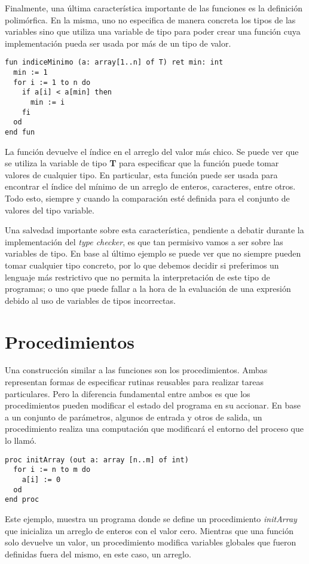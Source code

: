 \documentclass{article}
\begin{document}
Finalmente, una última característica importante de las funciones es la definición polimórfica.
En la misma, uno no especifica de manera concreta los tipos de las variables sino que utiliza una variable de tipo para poder crear una función cuya implementación pueda ser usada por más de un tipo de valor.
\begin{lstlisting}
fun indiceMinimo (a: array[1..n] of T) ret min: int
  min := 1
  for i := 1 to n do
    if a[i] < a[min] then
      min := i
    fi
  od
end fun
\end{lstlisting}

La función devuelve el índice en el arreglo del valor más chico.
Se puede ver que se utiliza la variable de tipo \textbf{T} para especificar que la función puede tomar valores de cualquier tipo.
En particular, esta función puede ser usada para encontrar el índice del mínimo de un arreglo de enteros, caracteres, entre otros.
Todo esto, siempre y cuando la comparación esté definida para el conjunto de valores del tipo variable.

Una salvedad importante sobre esta característica, pendiente a debatir durante la implementación del \textit{type checker}, es que tan permisivo vamos a ser sobre las variables de tipo.
En base al último ejemplo se puede ver que no siempre pueden tomar cualquier tipo concreto, por lo que debemos decidir si preferimos un lenguaje más restrictivo que no permita la interpretación de este tipo de programas; o uno que puede fallar a la hora de la evaluación de una expresión debido al uso de variables de tipos incorrectas.

\section{Procedimientos}

Una construcción similar a las funciones son los procedimientos.
Ambas representan formas de especificar rutinas reusables para realizar tareas particulares.
Pero la diferencia fundamental entre ambos es que los procedimientos pueden modificar el estado del programa en su accionar.
En base a un conjunto de parámetros, algunos de entrada y otros de salida, un procedimiento realiza una computación que modificará el entorno del proceso que lo llamó.
\begin{lstlisting}
proc initArray (out a: array [n..m] of int)
  for i := n to m do
    a[i] := 0
  od
end proc
\end{lstlisting}

Este ejemplo, muestra un programa donde se define un procedimiento \textit{initArray} que inicializa un arreglo de enteros con el valor cero.
Mientras que una función solo devuelve un valor, un procedimiento modifica variables globales que fueron definidas fuera del mismo, en este caso, un arreglo.
\end{document}
